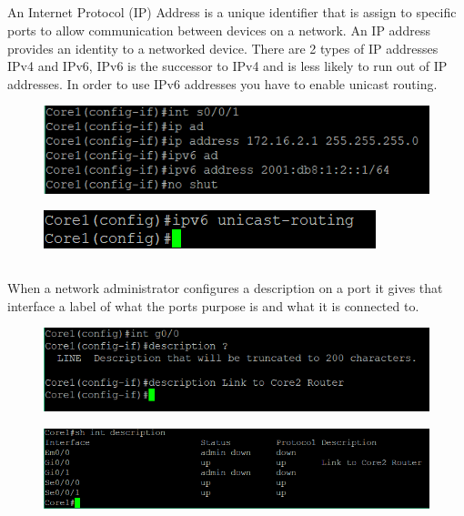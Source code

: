\documentclass{article}
\begin{document}
\subsection{}
An Internet Protocol (IP) Address is a unique identifier that is assign to specific ports to allow communication between devices on a network. An IP address provides an identity to a networked device. There are 2 types of IP addresses IPv4 and IPv6, IPv6 is the successor to IPv4 and is less likely to run out of IP addresses. In order to use IPv6 addresses you have to enable unicast routing.
\begin{figure}[h]
	\includegraphics[width=1\linewidth]{"configure ip address"}
	\caption{}
\end{figure}
\begin{figure}[h]
	\includegraphics[width=1\linewidth]{"enable ipv6 core1"}
	\caption{}
\end{figure}
\newpage
\subsection{}
When a network administrator configures a description on a port it gives that interface a label of what the ports purpose is and what it is connected to.
\begin{figure}[h]
	\includegraphics[width=1\linewidth]{description}
	\caption{}
\end{figure}
\begin{figure}[h]
	\includegraphics[width=1\linewidth]{"show description"}
	\caption{}
\end{figure}
\end{document}
